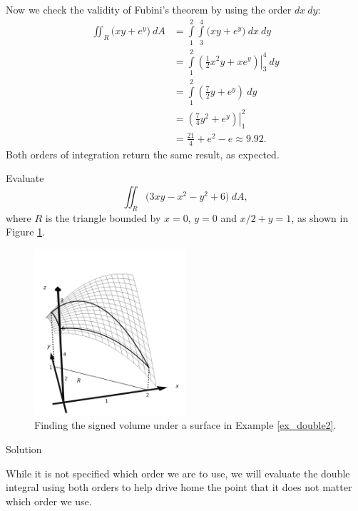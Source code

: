 \begin{example}
Now we check the validity of Fubini's theorem by using the order $dx\ dy$:
\allowdisplaybreaks
\begin{align*}
\iint_R\big(xy+e^y\big) \ dA &= \int\limits_1^2\int\limits_3^4\big(xy+e^y\big)\ dx \ dy \\
		&= \int\limits_1^2\left.\left(\frac12x^2y+xe^y\right)\right|_3^4\ dy\\
		&= \int\limits_1^2\left(\frac72y+e^y\right)\ dy\\
		&= \left.\left(\frac74y^2+e^y\right)\right|_1^2\\
		&=\frac{21}4+e^2-e\approx 9.92.
\end{align*}
Both orders of integration return the same result, as expected.
\end{example}


\begin{example}\label{ex_double2}
Evaluate $$\iint_R \big(3xy-x^2-y^2+6\big)\ dA,$$
where $R$ is the triangle bounded by $x=0$, $y=0$ and  $x/2+y=1$, as shown in Figure \ref{fig_multiple_8}.

\begin{figure}[H]
	\begin{center}
			\includegraphics[width=0.5\textwidth]{fig_multiple_8}
	\caption{Finding the signed volume under a surface in Example \ref{ex_double2}.}
	\label{fig_multiple_8}
	\end{center}
\end{figure}


Solution 

While it is not specified which order we are to use, we will evaluate the double integral using both orders to help drive home the point that it does not matter which order we use.\\



\end{example}
